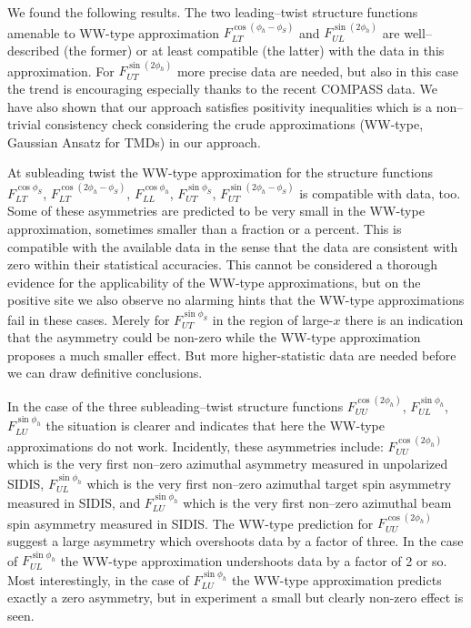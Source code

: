 \documentclass[a4paper,11pt]{article}
\begin{document}
We found the following results. The two leading--twist 
structure functions amenable to WW-type approximation 
	$F_{LT}^{\cos(\phi_h -\phi_S)}$ and 
	$F_{UL}^{\sin(2\phi_h)}$ 
are well--described (the former) or at least compatible 
(the latter) with the data in this approximation. For 
$F_{UT}^{\sin(2\phi_h)}$ more precise data are needed, 
but also in this case the trend is encouraging
especially thanks to the recent COMPASS data.
We have also shown that our approach satisfies positivity
inequalities which is a non--trivial consistency check 
considering the crude approximations (WW-type, Gaussian 
Ansatz for TMDs) in our approach.

At subleading twist the WW-type approximation for the
structure functions 
	$F_{LT}^{\cos\phi_S}$,
	$F_{LT}^{\cos(2\phi_h-\phi_S)}$,
	$F_{LL}^{\cos\phi_h}$,
	$F_{UT}^{\sin\phi_S}$,
	$F_{UT}^{\sin(2\phi_h-\phi_S)}$
is compatible with data, too. Some of these asymmetries are
predicted to be very small in the WW-type approximation,
sometimes smaller than a fraction or a percent. This is
compatible with the available data in the sense that the
data are consistent with zero within their statistical
accuracies. This cannot be considered a thorough evidence
for the applicability of the WW-type approximations, but
on the positive site we also observe no alarming hints
that the WW-type approximations fail in these cases.
Merely for $F_{UT}^{\sin\phi_S}$ in the region of large-$x$
there is an indication that the asymmetry could be 
non-zero while the WW-type approximation proposes
a much smaller effect. But more higher-statistic data 
are needed before we can draw definitive conclusions.

In the case of the three subleading--twist structure functions 
	$F_{UU}^{\cos(2\phi_h)}$, 
	$F_{UL}^{\sin\phi_h}$,
	$F_{LU}^{\sin\phi_h}$
the situation is clearer and indicates that here the WW-type
approximations do not work.
Incidently, these asymmetries include: 	$F_{UU}^{\cos(2\phi_h)}$ which 
is the very first non--zero azimuthal asymmetry measured in unpolarized SIDIS,
$F_{UL}^{\sin\phi_h}$ which is the very first non--zero azimuthal target spin 
asymmetry measured in SIDIS, and $F_{LU}^{\sin\phi_h}$ which is the 
very first non--zero azimuthal beam spin asymmetry measured in SIDIS.
The WW-type prediction for $F_{UU}^{\cos(2\phi_h)}$ suggest a large asymmetry
which overshoots data by a factor of three. In the case of $F_{UL}^{\sin\phi_h}$
the WW-type approximation undershoots data by a factor of 2 or so.
Most interestingly, in the case of $F_{LU}^{\sin\phi_h}$ the WW-type
approximation predicts exactly a zero asymmetry, but in experiment
a small but clearly non-zero effect is seen.
\end{document}
